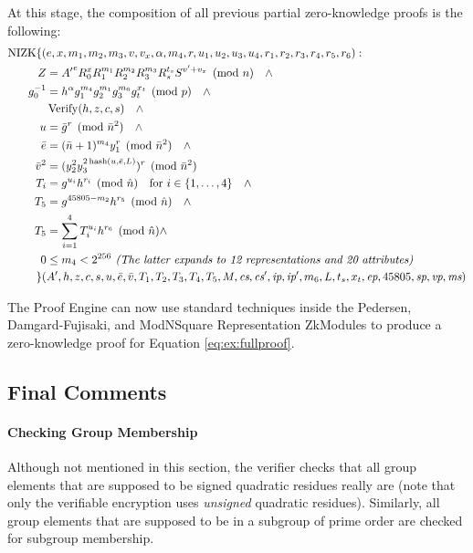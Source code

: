 \noindent
At this stage, the composition of all previous partial zero-knowledge proofs is the
following:
\begin{align}
\label{eq:ex:fullproof}
\operatorname{NIZK}\lbrace(&
e, x, m_1, m_2, m_3, v, v_x, \alpha, m_4, r, u_1, u_2, u_3, u_4, r_1, r_2, r_3, r_4, r_5, r_6
): \\
Z &= {A'}^e R_0^{x} R_1^{m_1} R_2^{m_2} R_3^{m_3} R_s^{t_s} S^{v' + v_x} \pmod{n} \quad\wedge\nonumber\\
g_0^{-1} &= h^\alpha g_1^{m_4} g_2^{m_1} g_3^{m_6} g_t^{x_t} \pmod{p} \quad\wedge\nonumber\\
&\operatorname{Verify}(h, z, c, s) \quad\wedge\nonumber \\
u &= {\bar g}^r \pmod{\bar n^2} \quad\wedge \nonumber\\
\bar e &= (\bar n+1)^{m_4} y_1^r \pmod{\bar n^2} \quad\wedge\nonumber\\
\bar v^2 &= (y_2^2 y_3^{2\operatorname{hash}(u, \bar e, L)})^r \pmod{\bar n^2} \nonumber\\
T_i &= g^{u_i} h^{r_i} \pmod{\hat n}\quad\mbox{for }i \in \lbrace1, \ldots,  4\rbrace \quad\wedge\nonumber\\
T_5 &= g^{45805-m_2} h^{r_5} \pmod{\hat n}\quad\wedge\nonumber\\
T_5 &= \sum_{i=1}^4 T_i^{u_i} h^{r_6} \pmod{\hat n} \wedge \nonumber\\
0 &\leq m_4 < 2^{256} \textit{ (The latter expands to 12 representations and 20 attributes)}\nonumber\\
\rbrace(&
A', h, z, c, s, u, \bar e, \bar v, T_1, T_2, T_3, T_4, T_5,
M, \emph{cs}, \emph{cs}', \emph{ip}, \emph{ip}', m_6, L, t_s, x_t, \emph{ep}, 45805, \emph{sp}, \emph{vp}, \emph{ms}
) \nonumber
\end{align}

The Proof Engine can now use standard techniques inside the Pedersen, Damgard-Fujisaki, and ModNSquare Representation ZkModules
to produce a zero-knowledge proof for Equation \ref{eq:ex:fullproof}.

\fi

\subsection{Final Comments}

\paragraph{Checking Group Membership}
Although not mentioned in this section, the verifier checks that all group elements that are supposed to be signed quadratic residues
really are (note that only the verifiable encryption uses \emph{unsigned} quadratic residues).
Similarly, all group elements that are supposed to be in a subgroup of prime order are checked for subgroup membership.
